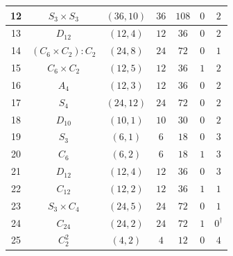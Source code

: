 \documentclass[12pt]{amsart}
\numberwithin{equation}{section}
\theoremstyle{plain}
\theoremstyle{definition}
\theoremstyle{remark}
\begin{document}
{\begin{longtable}{|c|c|c|c|c|c|c|}
12 & $S_3\times S_3$                     & $(36,10)$   & $36$   & $108$   & $0$ & $2$ \\ \hline
13 & $D_{12}$                             & $(12,4)$    & $12$   & $36$    & $0$ & $2$ \\ \hline
14 & $(C_6\times C_2):C_2$               & $(24,8)$    & $24$   & $72$    & $0$ & $1$ \\ \hline
15 & $C_6\times C_2$                     & $(12,5)$    & $12$   & $36$    & $1$ & $2$ \\ \hline
16 & $A_4$                                & $(12,3)$    & $12$   & $36$    & $0$ & $2$ \\ \hline
17 & $S_4$                                & $(24,12)$   & $24$   & $72$    & $0$ & $2$ \\ \hline
18 & $D_{10}$                             & $(10,1)$    & $10$   & $30$    & $0$ & $2$ \\ \hline
19 & $S_3$                                & $(6,1)$     & $6$    & $18$    & $0$ & $3$ \\ \hline
20 & $C_6$                                & $(6,2)$     & $6$    & $18$    & $1$ & $3$ \\ \hline
21 & $D_{12}$                             & $(12,4)$    & $12$   & $36$    & $0$ & $3$ \\ \hline
22 & $C_{12}$                             & $(12,2)$    & $12$   & $36$    & $1$ & $1$ \\ \hline
23 & $S_3\times C_4$                     & $(24,5)$    & $24$   & $72$    & $0$ & $1$ \\ \hline
24 & $C_{24}$                             & $(24,2)$    & $24$   & $72$    & $1$ & $0^\dagger$ \\ \hline
25 & $C_2^2$                              & $(4,2)$     & $4$    & $12$    & $0$ & $4$ \\ \hline

\end{longtable}}
\end{document}
